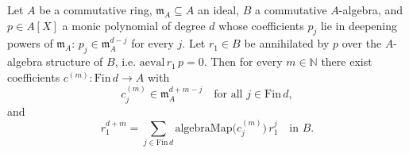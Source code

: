 \begin{lemma}
\label{lem:henselianPair-cayley-hamilton-power-expansion}
Let $A$ be a commutative ring, $\mathfrak m_A \subseteq A$ an
ideal, $B$ a commutative $A$-algebra, and $p \in A[X]$ a monic
polynomial of degree $d$ whose coefficients $p_j$ lie in deepening
powers of $\mathfrak m_A$:
$p_j \in \mathfrak m_A^{d - j}$ for every $j$. Let $r_1 \in B$ be
annihilated by $p$ over the $A$-algebra structure of $B$, i.e.
$\mathrm{aeval}\,r_1\,p = 0$. Then for every $m \in \mathbb N$
there exist coefficients $c^{(m)} : \mathrm{Fin}\,d \to A$ with
\[
c^{(m)}_j \in \mathfrak m_A^{d + m - j}
\quad\text{for all } j \in \mathrm{Fin}\,d,
\]
and
\[
r_1^{d + m} =
\sum_{j \in \mathrm{Fin}\,d}
\mathrm{algebraMap}\bigl(c^{(m)}_j\bigr)\,r_1^{j}
\quad\text{in } B.
\]
\end{lemma}

